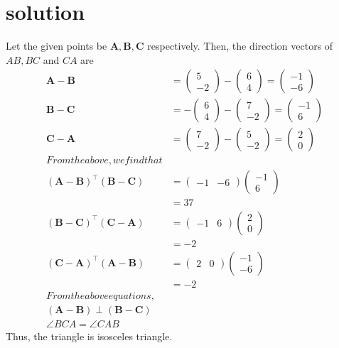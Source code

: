 \documentclass[10pt, a4paper]{article}
\newcommand{\myvec}[1]{\ensuremath{\begin{pmatrix}#1\end{pmatrix}}}
\providecommand{\brak}[1]{\ensuremath{\left(#1\right)}}
\let\vec\mathbf
\begin{document}
  \section{solution} Let the given points be $\vec{A}, \vec{B}, \vec{C}$ respectively. 
			 Then, the direction vectors of $AB, BC$ and $CA$ are
\begin{align}
			\vec{A} -\vec{B}&= \myvec{5 \\ -2} -\myvec{6 \\ 4} = \myvec{-1 \\ -6}\\
			\vec{B} -\vec{C}&=  -\myvec{6 \\ 4}-\myvec{7 \\ -2} = \myvec{-1 \\ 6}\\
			\vec{C} -\vec{A}&= \myvec{7 \\ -2} -\myvec{5 \\ -2} = \myvec{2 \\ 0}\\
		From the above,  we find that\\
			\brak{\vec{A} -\vec{B}}^{\top}\brak{\vec{B} -\vec{C}}&=  \myvec{-1 & -6}\myvec{-1 \\ 6}\\
			&=37\\
			\brak{\vec{B} -\vec{C}}^{\top}\brak{\vec{C} -\vec{A}}&=  \myvec{-1 & 6}\myvec{2 \\ 0}\\
			&=-2\\
			\brak{\vec{C} -\vec{A}}^{\top}\brak{\vec{A} -\vec{B}}&=  \myvec{2 & 0}\myvec{-1 \\ -6}\\
			&=-2\\
		From  the above equations, \\
			\brak{\vec{A} -\vec{B}}\perp \brak{\vec{B} -\vec{C}}\\
			\angle BCA = 
			\angle CAB  
\end{align}
		Thus, the triangle is isosceles triangle.
\end{document}
